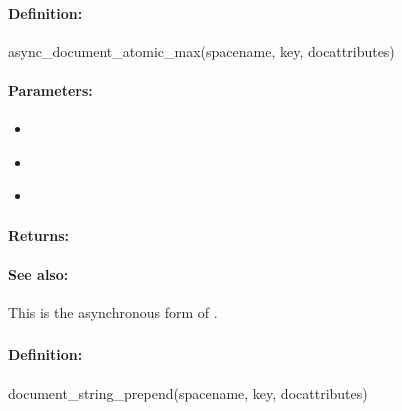 \paragraph{Definition:}
\begin{rubycode}
async_document_atomic_max(spacename, key, docattributes)
\end{rubycode}

\paragraph{Parameters:}
\begin{itemize}[noitemsep]
\item {}\\

\item {}\\

\item {}\\

\end{itemize}

\paragraph{Returns:}


\paragraph{See also:}  This is the asynchronous form of .

\pagebreak
\subsubsection{}
\label{api:ruby:document_string_prepend}


\paragraph{Definition:}
\begin{rubycode}
document_string_prepend(spacename, key, docattributes)
\end{rubycode}

